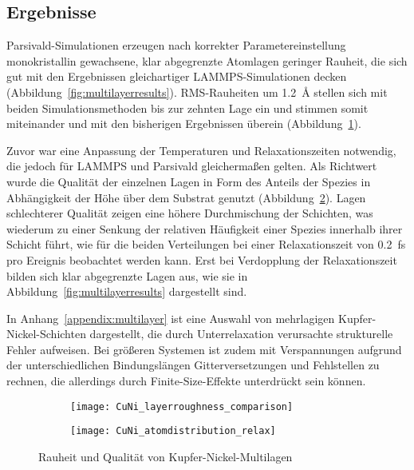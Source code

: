 \subsection{Ergebnisse}

Parsivald-Simulationen erzeugen nach korrekter Parametereinstellung monokristallin gewachsene, klar abgegrenzte Atomlagen geringer Rauheit, die sich gut mit den Ergebnissen gleichartiger LAMMPS-Simulationen decken (Abbildung~\ref{fig:multilayerresults}).
RMS-Rauheiten um \SI{1.2}{\angstrom} stellen sich mit beiden Simulationsmethoden bis zur zehnten Lage ein und stimmen somit miteinander und mit den bisherigen Ergebnissen überein (Abbildung~\ref{fig:multilayerplots-a}).

Zuvor war eine Anpassung der Temperaturen und Relaxationszeiten notwendig, die jedoch für LAMMPS und Parsivald gleichermaßen gelten.
Als Richtwert wurde die Qualität der einzelnen Lagen in Form des Anteils der Spezies in Abhängigkeit der Höhe über dem Substrat genutzt (Abbildung~\ref{fig:multilayerplots-b}).
Lagen schlechterer Qualität zeigen eine höhere Durchmischung der Schichten, was wiederum zu einer Senkung der relativen Häufigkeit einer Spezies innerhalb ihrer Schicht führt, wie für die beiden Verteilungen bei einer Relaxationszeit von \SI{0.2}{\femto\second} pro Ereignis beobachtet werden kann.
Erst bei Verdopplung der Relaxationszeit bilden sich klar abgegrenzte Lagen aus, wie sie in Abbildung~\ref{fig:multilayerresults} dargestellt sind.

In Anhang~\ref{appendix:multilayer} ist eine Auswahl von mehrlagigen Kupfer-Nickel-Schichten dargestellt, die durch Unterrelaxation verursachte strukturelle Fehler aufweisen.
Bei größeren Systemen ist zudem mit Verspannungen aufgrund der unterschiedlichen Bindungslängen Gitterversetzungen und Fehlstellen zu rechnen, die allerdings durch Finite-Size-Effekte unterdrückt sein können.

\begin{figure}
  \captionsetup[subfigure]{singlelinecheck=false}
  \def\subfigwidth{7cm}
  \begin{subfigure}[t]{\subfigwidth}
    \texttt{[image: CuNi\_layerroughness\_comparison]}
    \label{fig:multilayerplots-a}
  \end{subfigure}
  \hfill
  \begin{subfigure}[t]{\subfigwidth}
    \texttt{[image: CuNi\_atomdistribution\_relax]}
    \label{fig:multilayerplots-b}
  \end{subfigure}
  \caption[Rauheit und Qualität von Kupfer-Nickel-Multilagen]{
    Rauheit und Qualität von Kupfer-Nickel-Multilagen
  }
  \label{fig:multilayerplots}
\end{figure}

